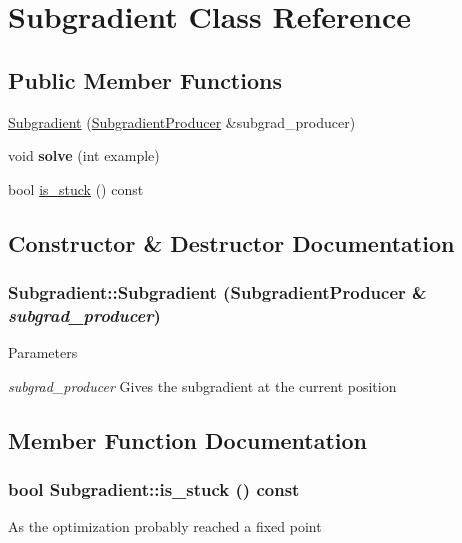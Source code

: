 \hypertarget{classSubgradient}{
\section{Subgradient Class Reference}
\label{classSubgradient}
}
\subsection*{Public Member Functions}
\begin{DoxyCompactItemize}
\item 
\hyperlink{classSubgradient_a2509e39964e1280532fd4994b3d747ce}{Subgradient} (\hyperlink{classSubgradientProducer}{SubgradientProducer} \&subgrad\_\-producer)
\item 
\hypertarget{classSubgradient_a183205851cdb362195baf914fb8d3ae0}{
void {\bfseries solve} (int example)}
\label{classSubgradient_a183205851cdb362195baf914fb8d3ae0}

\item 
bool \hyperlink{classSubgradient_a54907389766b702c467cf2ab20f8d051}{is\_\-stuck} () const 
\end{DoxyCompactItemize}


\subsection{Constructor \& Destructor Documentation}
\hypertarget{classSubgradient_a2509e39964e1280532fd4994b3d747ce}{
\subsubsection[{Subgradient}]{\setlength{\rightskip}{0pt plus 5cm}Subgradient::Subgradient ({\bf SubgradientProducer} \& {\em subgrad\_\-producer})}}
\label{classSubgradient_a2509e39964e1280532fd4994b3d747ce}

\begin{DoxyParams}{Parameters}
\item[{\em subgrad\_\-producer}]Gives the subgradient at the current position \end{DoxyParams}


\subsection{Member Function Documentation}
\hypertarget{classSubgradient_a54907389766b702c467cf2ab20f8d051}{
\subsubsection[{is\_\-stuck}]{\setlength{\rightskip}{0pt plus 5cm}bool Subgradient::is\_\-stuck () const}}
\label{classSubgradient_a54907389766b702c467cf2ab20f8d051}
As the optimization probably reached a fixed point

